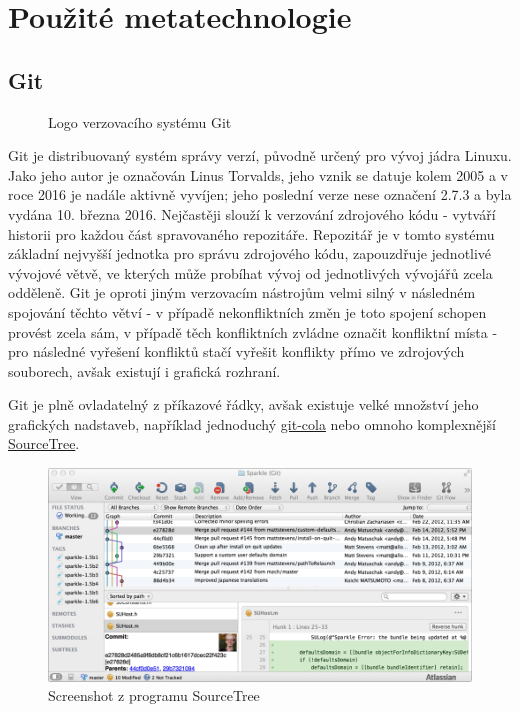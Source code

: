 \section{Použité metatechnologie}

\subsection{Git}
\label{subsec:git}

\begin{figure}
 \centering
 
 \caption{Logo verzovacího systému Git}
\end{figure}

Git je distribuovaný systém správy verzí, původně určený pro vývoj jádra Linuxu. Jako jeho autor je označován Linus Torvalds, jeho vznik se datuje kolem 2005 a v roce 2016 je nadále aktivně vyvíjen; jeho poslední verze nese označení 2.7.3 a byla vydána 10. března 2016. Nejčastěji slouží k verzování zdrojového kódu - vytváří historii pro každou část spravovaného repozitáře. Repozitář je v tomto systému základní nejvyšší jednotka pro správu zdrojového kódu, zapouzdřuje jednotlivé vývojové větvě, ve kterých může probíhat vývoj od jednotlivých vývojářů zcela odděleně. Git je oproti jiným verzovacím nástrojům velmi silný v následném spojování těchto větví - v případě nekonfliktních změn je toto spojení schopen provést zcela sám, v případě těch konfliktních zvládne označit konfliktní místa - pro následné vyřešení konfliktů stačí vyřešit konflikty přímo ve zdrojových souborech, avšak existují i grafická rozhraní.

Git je plně ovladatelný z příkazové řádky, avšak existuje velké množství jeho grafických nadstaveb, například jednoduchý \href{http://git-cola.github.io/}{git-cola} nebo omnoho komplexnější \href{https://www.sourcetreeapp.com/}{SourceTree}.

\begin{figure}[H]
 \centering
 \includegraphics[width=\textwidth]{images/source-tree-screenshot}
 \caption{Screenshot z programu SourceTree}
\end{figure}

